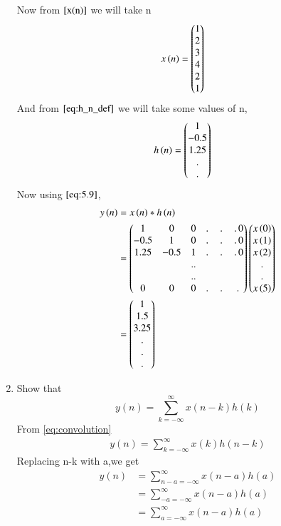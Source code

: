 \documentclass[journal,12pt,twocolumn]{IEEEtran}
\renewcommand\thesection{\arabic{section}}
\begin{document}
\begin{enumerate}[label=\thesection.\arabic*]
	Now from $\eqref{x(n)}$ we will take n 
	\begin{align}
		x\left(n\right) &= \begin{pmatrix}1\\2\\3\\4\\2\\1\end{pmatrix}
	\end{align}
	And from $\eqref{eq:h_n_def}$ we will take some values of n,
	\begin{align} 
		h\left(n\right) &= \begin{pmatrix}1 \\ -0.5 \\ 1.25 \\. \\ . \end{pmatrix}
	\end{align}
	Now using $\eqref{eq:5.9}$,
	\begin{align}
		y\left(n\right) &= x\left(n\right)*h\left(n\right)\\
		&= \begin{pmatrix}1 & 0 & 0 &.\,&.\,&.\,0 \\
			-0.5 & 1 & 0 & .\,&.\,&.\,0 \\
			1.25 & -0.5 & 1 & .\,&.\,&.\,0 \\
			&&..\\&&..\\ 0 & 0 &  0 &.\,&.\,&.\, \end{pmatrix}\begin{pmatrix}x\left(0\right)\\x\left(1\right)\\x\left(2\right)\\ . \\.\\x\left(5\right)\end{pmatrix} \\
		&= \begin{pmatrix}1\\1.5\\3.25\\.\\.\\.\end{pmatrix}
	\end{align}
	
	\item Show that
	\begin{equation}
		y(n) =  \sum_{k=-\infty}^{\infty}x(n-k)h(k)
	\end{equation}
	\solution From \eqref{eq:convolution}
	\begin{align}
		y(n) = \sum_{k=-\infty}^{\infty}x(k)h(n-k)
	\end{align}
	Replacing n-k with a,we get
	\begin{align}
		y(n) &= \sum_{n-a=-\infty}^{\infty}x(n-a)h(a)\\
		&=\sum_{-a=-\infty}^{\infty}x(n-a)h(a)\\
		&=\sum_{a=-\infty}^{\infty}x(n-a)h(a)
	\end{align}
\end{enumerate}
%
\end{document}
